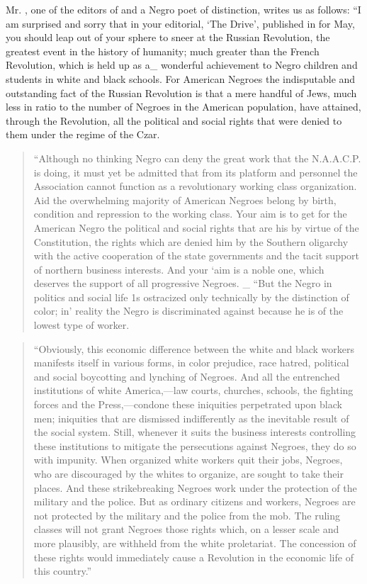 \documentclass[letterpaper,10pt,english]{jupyterBook}
\begin{document}
\sphinxAtStartPar
Mr. , one of the editors of  and a Negro poet of distinction, writes us as follows: “I am surprised and sorry that in your editorial, ‘The Drive’, published in  for May, you should leap out of your sphere to sneer at the Russian Revolution, the greatest event in the history of humanity; much greater than the French Revolution, which is held up as a\_ wonderful achievement to Negro children and students in white and black schools. For American Negroes the indisputable and outstanding fact of the Russian Revolution is that a mere handful of Jews, much less in ratio to the number of Negroes in the American population, have attained, through the Revolution, all the political and social rights that were denied to them under the regime of the Czar.
\begin{quote}

\sphinxAtStartPar
“Although no thinking Negro can deny the great work that the N.A.A.C.P. is doing, it must yet be admitted that from its platform and personnel the Association cannot function as a revolutionary working class organization. Aid the overwhelming majority of American Negroes belong by birth, condition and repression to the working class. Your aim is to get for the American Negro the political and social rights that are his by virtue of the Constitution, the rights which are denied him by the Southern oligarchy with the active cooperation of the state governments and the tacit support of northern business interests. And your ‘aim is a noble one, which deserves the support of all progressive Negroes. \_ “But the Negro in politics and social life 1s ostracized only technically by the distinction of color; in’ reality the Negro is discriminated against because he is of the lowest type of worker.
\end{quote}
\begin{quote}

\sphinxAtStartPar
“Obviously, this economic difference between the white and black workers manifests itself in various forms, in color prejudice, race hatred, political and social boycotting and lynching of Negroes. And all the entrenched institutions of white America,—law courts, churches, schools, the fighting forces and the Press,—condone these iniquities perpetrated upon black men; iniquities that are dismissed indifferently as the inevitable result of the social system. Still, whenever it suits the business interests controlling these institutions to mitigate the persecutions against Negroes, they do so with impunity. When organized white workers quit their jobs, Negroes, who are discouraged by the whites to organize, are sought to take their places. And these strike\sphinxhyphen{}breaking Negroes work under the protection of the military and the police. But as ordinary citizens and workers, Negroes are not protected by the military and the police from the mob. The ruling classes will not grant Negroes those rights which, on a lesser scale and more plausibly, are withheld from the white proletariat. The concession of these rights would immediately cause a Revolution in the economic life of this country.”
\end{quote}
\end{document}
